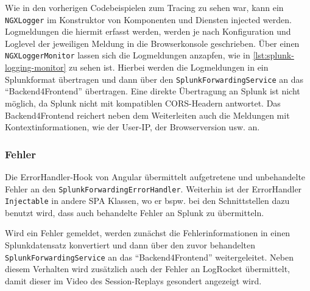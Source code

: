 

Wie in den vorherigen Codebeispielen zum Tracing zu sehen war, kann ein \texttt{NGXLogger} im Konstruktor von Komponenten und Diensten injected werden. Logmeldungen die hiermit erfasst werden, werden je nach Konfiguration und Loglevel der jeweiligen Meldung in die Browserkonsole geschrieben. Über einen \texttt{NGXLoggerMonitor} lassen sich die Logmeldungen anzapfen, wie in \autoref{lst:splunk-logging-monitor} zu sehen ist. Hierbei werden die Logmeldungen in ein Splunkformat übertragen und dann über den \texttt{SplunkForwardingService} an das \enquote{Backend4Frontend} übertragen. Eine direkte Übertragung an Splunk ist nicht möglich, da Splunk nicht mit kompatiblen CORS-Headern antwortet. Das Backend4Frontend reichert neben dem Weiterleiten auch die Meldungen mit Kontextinformationen, wie der User-IP, der Browserversion usw. an.



\subsubsection{Fehler}

Die ErrorHandler-Hook von Angular übermittelt aufgetretene und unbehandelte Fehler an den \texttt{SplunkForwardingErrorHandler}. Weiterhin ist der ErrorHandler \texttt{Injectable} in andere SPA Klassen, wo er bspw. bei den Schnittstellen dazu benutzt wird, dass auch behandelte Fehler an Splunk zu übermitteln.

Wird ein Fehler gemeldet, werden zunächst die Fehlerinformationen in einen Splunkdatensatz konvertiert und dann über den zuvor behandelten \texttt{SplunkForwardingService} an das \enquote{Backend4Frontend} weitergeleitet. Neben diesem Verhalten wird zusätzlich auch der Fehler an LogRocket übermittelt, damit dieser im Video des Session-Replays gesondert angezeigt wird.



